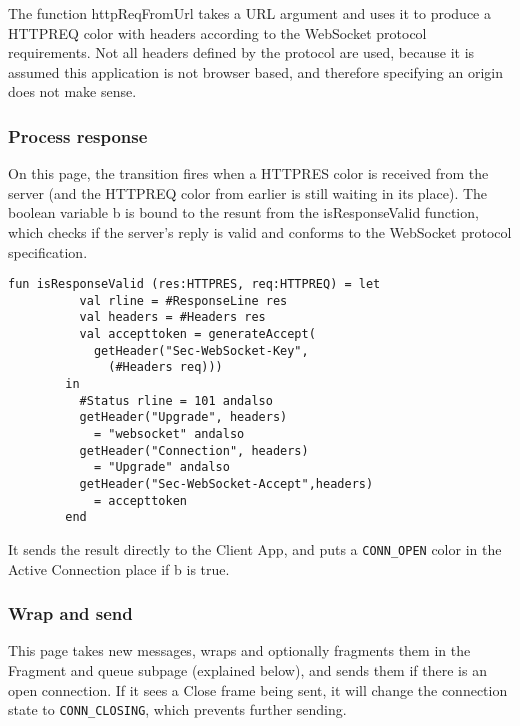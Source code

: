 		The function httpReqFromUrl takes a URL argument and uses it to produce a
		HTTPREQ color with headers according to the WebSocket protocol requirements.
		Not all headers defined by the protocol are used, because it is assumed this
		application is not browser based, and therefore specifying an origin does not
		make sense.
		
		
	\subsubsection{Process response}
		
		
		On this page, the transition fires when a HTTPRES color is received from the
		server (and the HTTPREQ color from earlier is still waiting in its place). The
		boolean variable b is bound to the resunt from the isResponseValid function,
		which checks if the server's reply is valid and conforms to the WebSocket
		protocol specification.
		
		\begin{lstlisting}[label=lst:isResponseValid,caption=isResponseValid,gobble=2]
		fun isResponseValid (res:HTTPRES, req:HTTPREQ) = let
		  val rline = #ResponseLine res
		  val headers = #Headers res
		  val accepttoken = generateAccept(
		    getHeader("Sec-WebSocket-Key",
		      (#Headers req)))
		in
		  #Status rline = 101 andalso
		  getHeader("Upgrade", headers) 
		    = "websocket" andalso
		  getHeader("Connection", headers) 
		    = "Upgrade" andalso
		  getHeader("Sec-WebSocket-Accept",headers)
		    = accepttoken
		end
		\end{lstlisting}
		
		It sends the result directly to the Client App, and puts a
		\lstinline:CONN_OPEN: color in the Active Connection place if b is true.
		
	\subsubsection{Wrap and send}
		
		
		This page takes new messages, wraps and optionally fragments them in the
		Fragment and queue subpage (explained below), and sends them if there is
		an open connection. If it sees a Close frame being sent, it will change the connection state to
		\lstinline:CONN_CLOSING:, which prevents further sending.
		
